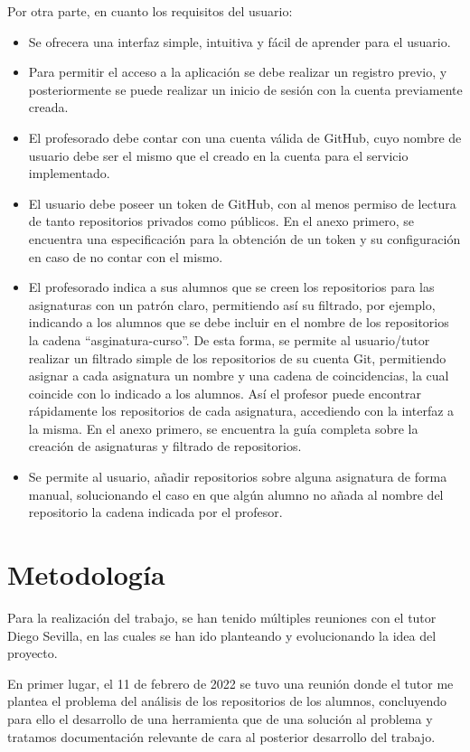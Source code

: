 Por otra parte, en cuanto los requisitos del usuario:
\begin{itemize}
	\item Se ofrecera una interfaz simple, intuitiva y fácil de aprender para el usuario.
	\item Para permitir el acceso a la aplicación se debe realizar un registro previo, y posteriormente se puede realizar un inicio de sesión con la cuenta previamente creada.
	\item El profesorado debe contar con una cuenta válida de GitHub, cuyo nombre de usuario debe ser el mismo que el creado en la cuenta para el servicio implementado.
 	\item El usuario debe poseer un token de GitHub, con al menos permiso de lectura de tanto repositorios privados como públicos. En el anexo primero, se encuentra una especificación para la obtención de un token y su configuración en caso de no contar con el mismo.
	\item El profesorado indica a sus alumnos que se creen los repositorios para las asignaturas con un patrón claro, permitiendo así su filtrado, por ejemplo, indicando a los alumnos que se debe incluir en el nombre de los repositorios la cadena ``asginatura-curso''. De esta forma, se permite al usuario/tutor realizar un filtrado simple de los repositorios de su cuenta Git, permitiendo asignar a cada asignatura un nombre y una cadena de coincidencias, la cual coincide con lo indicado a los alumnos. Así el profesor puede encontrar rápidamente los repositorios de cada asignatura, accediendo con la interfaz a la misma. En el anexo primero, se encuentra la guía completa sobre la creación de asignaturas y filtrado de repositorios.
	\item Se permite al usuario, añadir repositorios sobre alguna asignatura de forma manual, solucionando el caso en que algún alumno no añada al nombre del repositorio la cadena indicada por el profesor.
\end{itemize}



\section{Metodología}

Para la realización del trabajo, se han tenido múltiples reuniones con el
tutor Diego Sevilla, en las cuales se han ido planteando y evolucionando la
idea del proyecto.

En primer lugar, el 11 de febrero de 2022 se tuvo una reunión donde el
tutor me plantea el problema del análisis de los repositorios de los
alumnos, concluyendo para ello el desarrollo de una herramienta que de una
solución al problema y tratamos documentación relevante de cara al
posterior desarrollo del trabajo.

